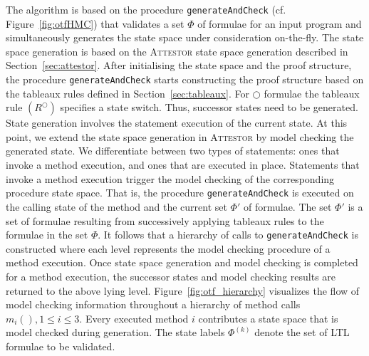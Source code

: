 \documentclass[a4paper, 12pt, twoside]{report}
\begin{document}
	The algorithm is based on the procedure \texttt{generateAndCheck} (cf. Figure~\ref{fig:otfHMC}) that validates a set $\Phi$ of formulae for an input program and simultaneously generates the state space under consideration on-the-fly. The state space generation is based on the \textsc{Attestor} state space generation described in Section~\ref{sec:attestor}. After initialising the state space and the proof structure, the procedure \texttt{generateAndCheck} starts constructing the proof structure based on the tableaux rules defined in Section~\ref{sec:tableaux}. For $\bigcirc$ formulae the tableaux rule $(R^{\bigcirc})$ specifies a state switch. Thus, successor states need to be generated. State generation involves the statement execution of the current state. At this point, we extend the state space generation in \textsc{Attestor} by model checking the generated state. We differentiate between two types of statements: ones that invoke a method execution, and ones that are executed in place. Statements that invoke a method execution trigger the model checking of the corresponding procedure state space. That is, the procedure \texttt{generateAndCheck} is executed on the calling state of the method and the current set $\Phi'$ of formulae. The set $\Phi'$ is a set of formulae resulting from successively applying tableaux rules to the formulae in the set $\Phi$. It follows that a hierarchy of calls to \texttt{generateAndCheck} is constructed where each level represents the model checking procedure of a method execution. Once state space generation and model checking is completed for a method execution, the successor states and model checking results are returned to the above lying level. Figure~\ref{fig:otf_hierarchy} visualizes the flow of model checking information throughout a hierarchy of method calls $m_i(), 1 \leq i \leq 3$. Every executed method $i$ contributes a state space that is model checked during generation. The state labels $\Phi^{(k)}$ denote the set of LTL formulae to be validated.
	
\end{document}
